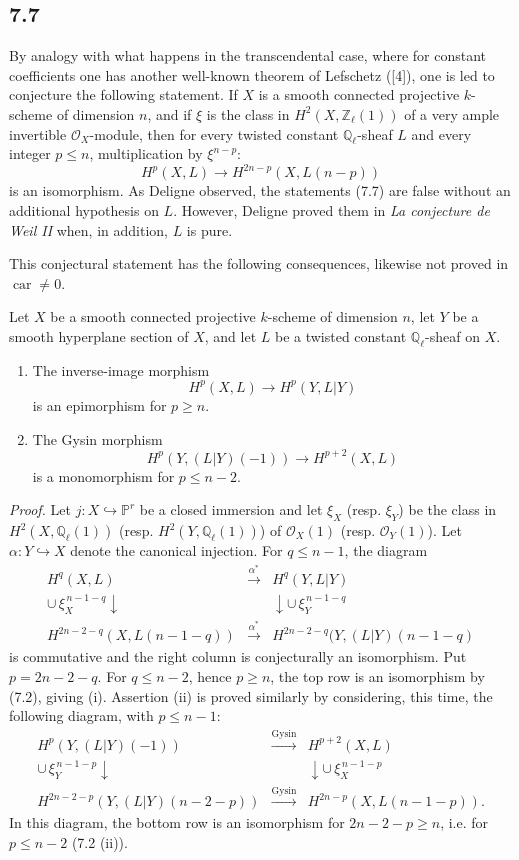 \documentclass[11pt]{article}
\begin{document}
\subsection*{7.7}

By analogy with what happens in the transcendental case, where for constant coefficients one has another well-known theorem of Lefschetz ([4]), one is led to conjecture the following statement. If $X$ is a smooth connected projective $k$-scheme of dimension $n$, and if $\xi$ is the class in $H^2(X,\mathbb Z_\ell(1))$ of a very ample invertible $\mathcal O_X$-module, then for every twisted constant $\mathbb Q_\ell$-sheaf $L$ and every integer $p\le n$, multiplication by $\xi^{n-p}$:
\[
H^p(X,L)\to H^{2n-p}(X,L(n-p))
\]
is an isomorphism. As Deligne observed, the statements (7.7) are false without an additional hypothesis on $L$. However, Deligne proved them in \emph{La conjecture de Weil II} when, in addition, $L$ is pure.

This conjectural statement has the following consequences, likewise not proved in $\operatorname{car}\ne0$.

Let $X$ be a smooth connected projective $k$-scheme of dimension $n$, let $Y$ be a smooth hyperplane section of $X$, and let $L$ be a twisted constant $\mathbb Q_\ell$-sheaf on $X$.
\begin{enumerate}[label=(\roman*)]
\item The inverse-image morphism
\[
H^p(X,L)\to H^p(Y,L|Y)
\]
is an epimorphism for $p\ge n$.
\item The Gysin morphism
\[
H^p(Y,(L|Y)(-1))\to H^{p+2}(X,L)
\]
is a monomorphism for $p\le n-2$.
\end{enumerate}

\emph{Proof.} Let $j:X\hookrightarrow\mathbb P^r$ be a closed immersion and let $\xi_X$ (resp. $\xi_Y$) be the class in $H^2(X,\mathbb Q_\ell(1))$ (resp. $H^2(Y,\mathbb Q_\ell(1))$) of $\mathcal O_X(1)$ (resp. $\mathcal O_Y(1)$). Let $\alpha:Y\hookrightarrow X$ denote the canonical injection. For $q\le n-1$, the diagram
\[
\begin{array}{ccc}
H^q(X,L)&\xrightarrow{\alpha^*}&H^q(Y,L|Y)\\
\cup\,\xi_X^{\,n-1-q}\downarrow&&\downarrow\cup\,\xi_Y^{\,n-1-q}\\
H^{2n-2-q}(X,L(n-1-q))&\xrightarrow{\alpha^*}&
H^{2n-2-q}(Y,(L|Y)(n-1-q)
\end{array}
\]
is commutative and the right column is conjecturally an isomorphism. Put $p=2n-2-q$. For $q\le n-2$, hence $p\ge n$, the top row is an isomorphism by (7.2), giving (i). Assertion (ii) is proved similarly by considering, this time, the following diagram, with $p\le n-1$:
\[
\begin{array}{ccc}
H^p(Y,(L|Y)(-1))&\xrightarrow{\mathrm{Gysin}}&H^{p+2}(X,L)\\
\cup\,\xi_Y^{\,n-1-p}\downarrow&&\downarrow\cup\,\xi_X^{\,n-1-p}\\
H^{2n-2-p}(Y,(L|Y)(n-2-p))&\xrightarrow{\mathrm{Gysin}}&
H^{2n-p}(X,L(n-1-p)).
\end{array}
\]
In this diagram, the bottom row is an isomorphism for $2n-2-p\ge n$, i.e. for $p\le n-2$ (7.2 (ii)).
\end{document}
